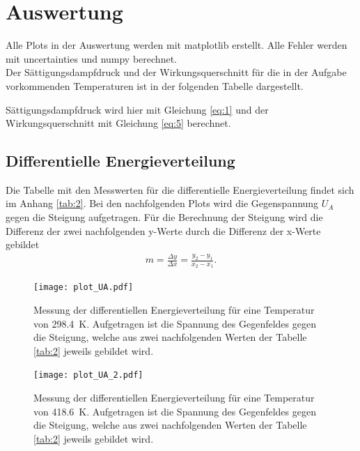 
\section{Auswertung}
Alle Plots in der Auswertung werden mit matplotlib \cite{matplotlib} erstellt.
Alle Fehler werden mit uncertainties \cite{uncertainties} und numpy \cite{numpy} berechnet.\\
Der Sättigungsdampfdruck und der Wirkungsquerschnitt für die in der Aufgabe vorkommenden
Temperaturen ist in der folgenden Tabelle dargestellt.

 Sättigungsdampfdruck wird hier mit Gleichung \eqref{eq:1} und der Wirkungsquerschnitt 
mit Gleichung \eqref{eq:5} berechnet.

\subsection{Differentielle Energieverteilung}

Die Tabelle mit den Messwerten für die differentielle Energieverteilung findet sich im Anhang \ref{tab:2}.
Bei den nachfolgenden Plots wird die Gegenspannung $U_A$ gegen die Steigung
aufgetragen. Für die Berechnung der Steigung wird die Differenz der zwei nachfolgenden
y-Werte durch die Differenz der x-Werte gebildet
\begin{align}
    m = \frac{\Delta y}{\Delta x}=\frac{y_2-y_1}{x_2-x_1} \label{eq:6}.
\end{align}

\begin{figure}[H]
    \centering
    \texttt{[image: plot\_UA.pdf]}
    \caption{
        Messung der differentiellen Energieverteilung für eine Temperatur von \SI{298.4}{\kelvin}.
        Aufgetragen ist die Spannung des Gegenfeldes gegen die Steigung, welche aus
        zwei nachfolgenden Werten der Tabelle \ref{tab:2} jeweils gebildet wird.
    } 
    \label{fig:5}
\end{figure}
\begin{figure}[H]
    \centering
    \texttt{[image: plot\_UA\_2.pdf]}
    \caption{
        Messung der differentiellen Energieverteilung für eine Temperatur von \SI{418.6}{\kelvin}.
        Aufgetragen ist die Spannung des Gegenfeldes gegen die Steigung, welche aus
        zwei nachfolgenden Werten der Tabelle \ref{tab:2} jeweils gebildet wird.
    } 
    \label{fig:6}
\end{figure}


